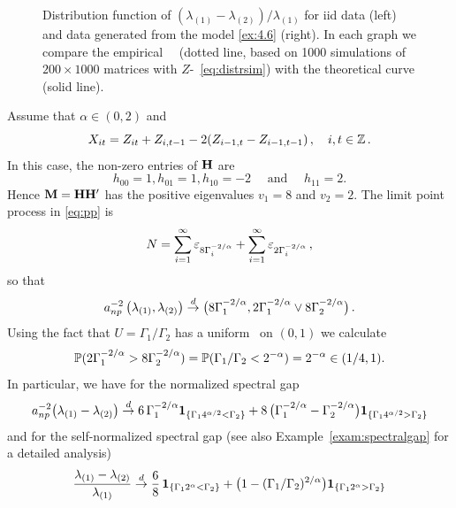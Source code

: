 \begin{example}
\begin{figure}[htb!]
{  }
  \caption{Distribution function of $(\lambda_{(1)} - \lambda_{(2)})/\lambda_{(1)}$ for iid data (left) and
    data generated from the model \eqref{ex:4.6} (right). In each graph we compare the empirical \ds\ \fct\
(dotted line, based on
1000 simulations of $200 \times 1000$ matrices with $Z$-\ds\ \eqref{eq:distrsim}) with the theoretical curve (solid line).}
  \label{fig:ProbMass}
\end{figure}
Assume that $\alpha\in (0,2)$ and
\begin{equation}\label{ex:4.6}
X_{it}= Z_{it}+ Z_{i,t-1}-2 (Z_{i-1,t}- Z_{i-1,t-1})\,,\quad i,t\in\Z\,.
\end{equation}
In this case, the non-zero entries of $\H$ are
\begin{equation*}
h_{00}=1, h_{01}=1,h_{10}=-2 \quad \mbox{ and }\quad h_{11}=2.
\end{equation*}
Hence $\M=\H\H'$ has the positive eigenvalues
$v_1=8$ and $v_2=2$. The limit point process in \eqref{eq:pp} is
\begin{equation*}
N=\sum_{i=1}^\infty \vep_{8\Gamma_i^{-2/\alpha}}+ \sum_{i=1}^\infty \vep_{2\Gamma_i^{-2/\alpha}}\,,
\end{equation*}
so that
\begin{equation*}
a_{np}^{-2}\,\big(\la_{(1)},\la_{(2)}\big) \cid
\big(8\Gamma_{1}^{-2/\alpha}, 2\Gamma_1^{-2/\alpha}\vee 8
\Gamma_2^{-2/\alpha}\big)\,.
\end{equation*}
Using the fact that $U=\Gamma_1/\Gamma_2$ has a uniform \ds\ on $(0,1)$ we calculate
\begin{equation*}
\P(2\Gamma_1^{-2/\alpha}>8\Gamma_2^{-2/\alpha})= \P(\Gamma_1/\Gamma_2<2^{-\alpha})= 2^{-\alpha} \in (1/4,1).
\end{equation*}
In particular, we have for the normalized spectral gap
\begin{equation*}
a_{np}^{-2} \big(\la_{(1)}-\la_{(2)}\big)\cid
6 \,\Gamma_1^{-2/\alpha} \1_{\{\Gamma_1 4^{\alpha/2 }<\Gamma_2\}}+
8\,
\big(\Gamma_1^{-2/\alpha}-\Gamma_2^{-2/\alpha}\big)\1_{\{\Gamma_14^{\alpha/2
  }> \Gamma_2\}}
\end{equation*}
and for the self-normalized spectral gap (see also Example~\ref{exam:spectralgap} for a detailed analysis)
\begin{equation*}
\begin{split}
\dfrac{\la_{(1)}-\la_{(2)}}{\la_{(1)}}&\cid
\dfrac{6}{8} \, \1_{\{\Gamma_1 2^{\alpha }<\Gamma_2\}}+
\big(1-(\Gamma_1/\Gamma_2)^{2/\alpha}\big)\1_{\{\Gamma_12^{\alpha
  }> \Gamma_2\}}\\

\end{split}
\end{equation*}
\end{example}
